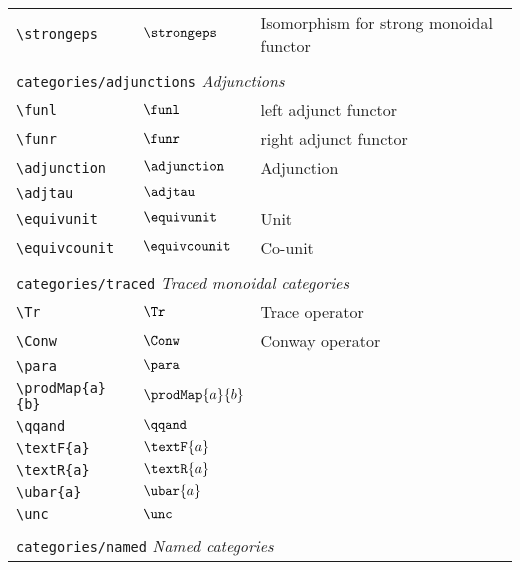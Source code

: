 \begin{longtable}{lll}
 {\color[rgb]{0.5,0.5,0.5}\texttt{\textbackslash strongeps}} & $\strongeps$ &  Isomorphism for strong monoidal functor\\ 
  &  & \\ 
 \multicolumn{3}{l}{{\color[rgb]{0.5,0.5,0.5}\texttt{categories/adjunctions}} \emph{Adjunctions}}\\ 
 \hline
{\color[rgb]{0.5,0.5,0.5}\texttt{\textbackslash funl}} & $\funl$ &  left adjunct functor\\ 
 {\color[rgb]{0.5,0.5,0.5}\texttt{\textbackslash funr}} & $\funr$ &  right adjunct functor\\ 
 {\color[rgb]{0.5,0.5,0.5}\texttt{\textbackslash adjunction}} & $\adjunction$ &  Adjunction\\ 
 {\color[rgb]{0.5,0.5,0.5}\texttt{\textbackslash adjtau}} & $\adjtau$ & \\ 
 {\color[rgb]{0.5,0.5,0.5}\texttt{\textbackslash equivunit}} & $\equivunit$ &  Unit\\ 
 {\color[rgb]{0.5,0.5,0.5}\texttt{\textbackslash equivcounit}} & $\equivcounit$ &  Co-unit\\ 
  &  & \\ 
 \multicolumn{3}{l}{{\color[rgb]{0.5,0.5,0.5}\texttt{categories/traced}} \emph{Traced monoidal categories}}\\ 
 \hline
{\color[rgb]{0.5,0.5,0.5}\texttt{\textbackslash Tr}} & $\Tr$ &  Trace operator\\ 
 {\color[rgb]{0.5,0.5,0.5}\texttt{\textbackslash Conw}} & $\Conw$ &  Conway operator\\ 
 {\color[rgb]{0.5,0.5,0.5}\texttt{\textbackslash para}} & $\para$ & \\ 
 {\color[rgb]{0.5,0.5,0.5}\texttt{\textbackslash prodMap\{a\}\{b\}}} & $\prodMap{a}{b}$ & \\ 
 {\color[rgb]{0.5,0.5,0.5}\texttt{\textbackslash qqand}} & $\qqand$ & \\ 
 {\color[rgb]{0.5,0.5,0.5}\texttt{\textbackslash textF\{a\}}} & $\textF{a}$ & \\ 
 {\color[rgb]{0.5,0.5,0.5}\texttt{\textbackslash textR\{a\}}} & $\textR{a}$ & \\ 
 {\color[rgb]{0.5,0.5,0.5}\texttt{\textbackslash ubar\{a\}}} & $\ubar{a}$ & \\ 
 {\color[rgb]{0.5,0.5,0.5}\texttt{\textbackslash unc}} & $\unc$ & \\ 
  &  & \\ 
 \multicolumn{3}{l}{{\color[rgb]{0.5,0.5,0.5}\texttt{categories/named}} \emph{Named categories}}\\ 

\end{longtable}
